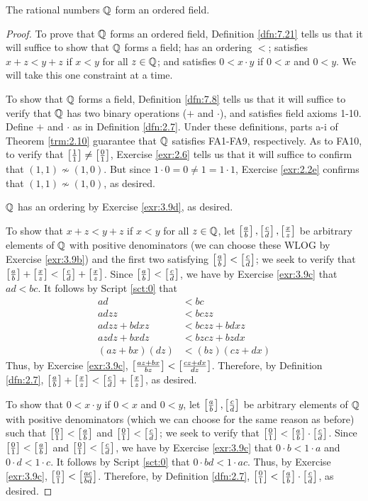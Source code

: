 \documentclass[../main.tex]{subfiles}
\begin{document}
\begin{theorem}\label{trm:7.29}
    The rational numbers $\mathbb{Q}$ form an ordered field.
    \begin{proof}
        To prove that $\mathbb{Q}$ forms an ordered field, Definition \ref{dfn:7.21} tells us that it will suffice to show that $\mathbb{Q}$ forms a field; has an ordering $<$; satisfies $x+z<y+z$ if $x<y$ for all $z\in\mathbb{Q}$; and satisfies $0<x\cdot y$ if $0<x$ and $0<y$. We will take this one constraint at a time.\par\smallskip
        To show that $\mathbb{Q}$ forms a field, Definition \ref{dfn:7.8} tells us that it will suffice to verify that $\mathbb{Q}$ has two binary operations ($+$ and $\cdot$), and satisfies field axioms 1-10. Define $+$ and $\cdot$ as in Definition \ref{dfn:2.7}. Under these definitions, parts a-i of Theorem \ref{trm:2.10} guarantee that $\mathbb{Q}$ satisfies FA1-FA9, respectively. As to FA10, to verify that $\left[ \frac{1}{1} \right]\neq\left[ \frac{0}{1} \right]$, Exercise \ref{exr:2.6} tells us that it will suffice to confirm that $(1,1)\nsim(1,0)$. But since $1\cdot 0=0\neq 1=1\cdot 1$, Exercise \ref{exr:2.2e} confirms that $(1,1)\nsim(1,0)$, as desired.\par
        $\mathbb{Q}$ has an ordering by Exercise \ref{exr:3.9d}, as desired.\par
        To show that $x+z<y+z$ if $x<y$ for all $z\in\mathbb{Q}$, let $\left[ \frac{a}{b} \right],\left[ \frac{c}{d} \right],\left[ \frac{x}{z} \right]$ be arbitrary elements of $\mathbb{Q}$ with positive denominators (we can choose these WLOG by Exercise \ref{exr:3.9b}) and the first two satisfying $\left[ \frac{a}{b} \right]<\left[ \frac{c}{d} \right]$; we seek to verify that $\left[ \frac{a}{b} \right]+\left[ \frac{x}{z} \right]<\left[ \frac{c}{d} \right]+\left[ \frac{x}{z} \right]$. Since $\left[ \frac{a}{b} \right]<\left[ \frac{c}{d} \right]$, we have by Exercise \ref{exr:3.9c} that $ad<bc$. It follows by Script \ref{sct:0} that
        \begin{align*}
            ad &< bc\\
            adzz &< bczz\\
            adzz+bdxz &< bczz+bdxz\\
            azdz+bxdz &< bzcz+bzdx\\
            (az+bx)(dz) &< (bz)(cz+dx)
        \end{align*}
        Thus, by Exercise \ref{exr:3.9c}, $\left[ \frac{az+bx}{bz} \right]<\left[ \frac{cz+dx}{dz} \right]$. Therefore, by Definition \ref{dfn:2.7}, $\left[ \frac{a}{b} \right]+\left[ \frac{x}{z} \right]<\left[ \frac{c}{d} \right]+\left[ \frac{x}{z} \right]$, as desired.\par
        To show that $0<x\cdot y$ if $0<x$ and $0<y$, let $\left[ \frac{a}{b} \right],\left[ \frac{c}{d} \right]$ be arbitrary elements of $\mathbb{Q}$ with positive denominators (which we can choose for the same reason as before) such that $\left[ \frac{0}{1} \right]<\left[ \frac{a}{b} \right]$ and $\left[ \frac{0}{1} \right]<\left[ \frac{c}{d} \right]$; we seek to verify that $\left[ \frac{0}{1} \right]<\left[ \frac{a}{b} \right]\cdot\left[ \frac{c}{d} \right]$. Since $\left[ \frac{0}{1} \right]<\left[ \frac{a}{b} \right]$ and $\left[ \frac{0}{1} \right]<\left[ \frac{c}{d} \right]$, we have by Exercise \ref{exr:3.9c} that $0\cdot b<1\cdot a$ and $0\cdot d<1\cdot c$. It follows by Script \ref{sct:0} that $0\cdot bd<1\cdot ac$. Thus, by Exercise \ref{exr:3.9c}, $\left[ \frac{0}{1} \right]<\left[ \frac{ac}{bd} \right]$. Therefore, by Definition \ref{dfn:2.7}, $\left[ \frac{0}{1} \right]<\left[ \frac{a}{b} \right]\cdot\left[ \frac{c}{d} \right]$, as desired.
    \end{proof}
\end{theorem}
\end{document}
